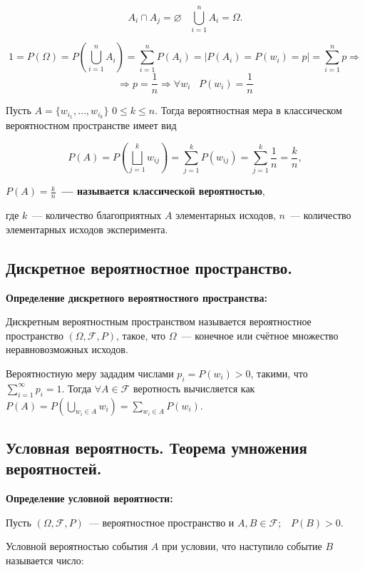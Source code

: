    \[
        A_i \cap A_j = \varnothing \;\;\; \bigcup^{n}_{i = 1} A_i = \Omega.  
    \]

    \[
        1 = P(\Omega) = P(\bigcup^{n}_{i = 1} A_i) = \sum^{n}_{i = 1} P(A_i) =
        | P(A_i) = P(w_i) = p | = \sum^{n}_{i = 1} p \Rightarrow
    \]
    \[
        \Rightarrow p = \frac{1}{n} \Rightarrow \forall w_i \;\;\; P(w_i) =
        \frac{1}{n}  
    \]

    Пусть $A = \{w_{i_1}, \dots, w_{i_k}\}$ $0 \leq k \leq n$. Тогда
    вероятностная мера в классическом вероятностном пространстве имеет
    вид 

    \[
        P(A) = P \left( \bigsqcup^{k}_{j = 1} w_{ij} \right) =
        \sum^{k}_{j = 1} P(w_{ij}) = \sum^{k}_{j = 1} \frac{1}{n} = \frac{k}{n},  
    \]
    \bigskip

    \textbf{$P(A) = \frac{k}{n}$~--- называется классической вероятностью},

    где $k$~--- количество благоприятных $A$ элементарных исходов,
    $n$~--- количество элементарных исходов эксперимента.

\subsection{Дискретное вероятностное пространство.}

\textbf{Определение дискретного вероятностного пространства:}
    \smallskip

    Дискретным вероятностным пространством называется вероятностное
    пространство $(\Omega, \mathcal{F}, P)$, такое, что 
    $\Omega$~--- конечное или счётное множество неравновозможных исходов.
    \bigskip

    Вероятностную меру зададим числами $p_i = P(w_i) > 0$, такими, что
    $\sum^{\infty}_{i = 1} p_i = 1$. Тогда $\forall A \in \mathcal{F}$
    веротность вычисляется как $P(A) = P(\bigcup\limits_{w_i \in A} w_i) =
    \sum\limits_{w_i \in A} P (w_i)$.

\subsection{Условная вероятность. Теорема умножения вероятностей.}    

\textbf{Определение условной вероятности:}
    \smallskip

    Пусть $(\Omega, \mathcal{F}, P)$~--- вероятностное пространство и
    $A, B \in \mathcal{F}; \;\;\; P(B) > 0$. 

    Условной вероятностью события $A$ при условии, что наступило
    событие $B$ называется число:

